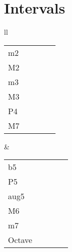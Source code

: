 \documentclass[a4paper,landscape]{article}
\begin{document}
\tableofcontents

\pagebreak

\section{Intervals}


\begin{tabular}{ll}

	\begin{tabular}{lcccc}
		m2 & \chordbox{all~strings}{x,x,5,1,x,x} & 
		     \chordbox{2nd~string}{x,x,x,4,1,x}  && \\
		M2 & \chordbox{all~strings}{x,x,4,1,x,x} & 
		     \chordbox{2nd~string}{x,x,x,3,1,x}  && \\
		m3 & \chordbox{all~strings}{x,x,3,1,x,x} & 
		     \chordbox{2nd~string}{x,x,x,2,1,x}  && \\
		M3 & \chordbox{all~strings}{x,x,3,2,x,x} & 
		     \chordbox{2nd~string}{x,x,x,3,3,x}  && \\
		P4 & \chordbox{all~strings}{x,x,2,2,x,x} & 
		     \chordbox{2nd~string}{x,x,x,2,3,x}  && \\
		M7 & \chordbox{all~strings}{x,3,x,4,x,x} & 
	         \chordbox{2nd~string}{x,x,2,x,4,x}  && \\
	\end{tabular}
	&
	\begin{tabular}{lcccc}
		b5 & \chordbox{all~strings}{x,x,2,3,x,x} & 
		     \chordbox{2nd~string}{x,x,x,1,3,x}  &
		     \chordbox{all~string}{x,5,x,1,x,x}  &
		     \chordbox{2nd~string}{x,x,4,x,1,x}  \\
		P5 & \chordbox{all~strings}{x,x,2,4,x,x} & 
		     \chordbox{2nd~string}{x,x,x,1,4,x}  &
		     \chordbox{all~string}{x,4,x,1,x,x}  &
		     \chordbox{1,2nd~string}{x,x,x,3,x,1}  \\
		aug5 & \chordbox{all~strings}{x,x,2,5,x,x} & 
		       \chordbox{2nd~string}{x,x,x,1,5,x}  &
		       \chordbox{all~string}{x,3,x,1,x,x}  &
		       \chordbox{1,2nd~string}{x,x,x,2,x,1} \\
		M6 & \chordbox{all~strings}{x,3,x,2,x,x} & 
		     \chordbox{2nd~string}{x,x,3,x,3,x}  && \\
		m7 & \chordbox{all~strings}{x,3,x,3,x,x} & 
	         \chordbox{2nd~string}{x,x,3,x,4,x}  && \\
		Octave & \chordbox{all~strings}{x,1,x,3,x,x} & 
		         \chordbox{2nd~string}{x,x,1,x,4,x}  && \\
	\end{tabular}

\end{tabular}
\end{document}
